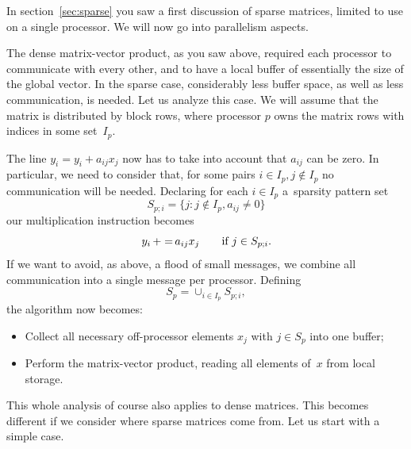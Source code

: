 
In section~\ref{sec:sparse} you saw a first discussion of sparse
matrices, limited to use on a single processor. We will now go into
parallelism aspects.

The dense matrix-vector product, as you saw above,
required each processor to communicate with every other, and to have a
local buffer of essentially the size of the global vector. In the
sparse case, considerably less buffer space, as well as less
communication, is needed. Let us analyze this case. We will assume
that the matrix is distributed by block rows, where processor $p$ owns
the matrix rows with indices in some set~$I_p$.

The line $y_i=y_i+a_{ij}x_j$ now has to take into account that $a_{ij}$
can be zero. In particular, we need to consider that, for some pairs
$i\in I_p, j\not\in I_p$ no communication will be needed. Declaring
for each $i\in I_p$ a~sparsity pattern set
\[ S_{p;i}=\{j\colon j\not\in I_p, a_{ij}\not=0\} \]
our multiplication instruction becomes
\[ y_i\mathop{+=}a_{ij}x_j\qquad\hbox{if $j\in S_{p;i}$}. \]
If we want to avoid, as above, a flood of small messages, we combine
all communication into a single message per processor. Defining
\[ S_p = \cup_{i\in I_p} S_{p;i}, \]
the algorithm now becomes:
\begin{itemize}
\item Collect all necessary off-processor elements $x_j$ with $j\in
  S_p$ into one buffer;
\item Perform the matrix-vector product, reading all elements of~$x$
  from local storage.
\end{itemize}

This whole analysis of course also applies to dense matrices. This
becomes different if we consider where sparse matrices come from.  Let
us start with a simple case.

